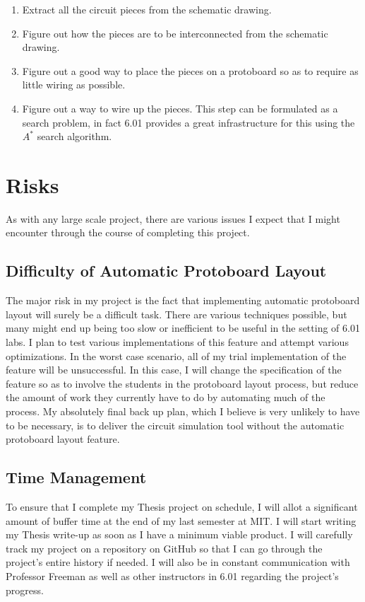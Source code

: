 \documentclass[12pt, doublespacing]{amsart}
\begin{document}
\begin{enumerate}
\item Extract all the circuit pieces from the schematic drawing.
\item Figure out how the pieces are to be interconnected from the schematic drawing.
\item Figure out a good way to place the pieces on a protoboard so as to require as little wiring as possible.
\item Figure out a way to wire up the pieces. This step can be formulated as a search problem, in fact 6.01 provides a great infrastructure for this using the $A^*$ search algorithm\cite{6.01search}.
\end{enumerate}

\section{Risks}
\label{sec:risks}
As with any large scale project, there are various issues I expect that I might encounter through the course of completing this project.

\subsection{Difficulty of Automatic Protoboard Layout}

The major risk in my project is the fact that implementing automatic protoboard layout will surely be a difficult task. There are various techniques possible, but many might end up being too slow or inefficient to be useful in the setting of 6.01 labs. I plan to test various implementations of this feature and attempt various optimizations. In the worst case scenario, all of my trial implementation of the feature will be unsuccessful. In this case, I will change the specification of the feature so as to involve the students in the protoboard layout process, but reduce the amount of work they currently have to do by automating much of the process. My absolutely final back up plan, which I believe is very unlikely to have to be necessary, is to deliver the circuit simulation tool without the automatic protoboard layout feature.

\subsection{Time Management}

To ensure that I complete my Thesis project on schedule, I will allot a significant amount of buffer time at the end of my last semester at MIT. I will start writing my Thesis write-up as soon as I have a minimum viable product. I will carefully track my project on a repository on GitHub so that I can go through the project's entire history if needed. I will also be in constant communication with Professor Freeman as well as other instructors in 6.01 regarding the project's progress.
\end{document}
